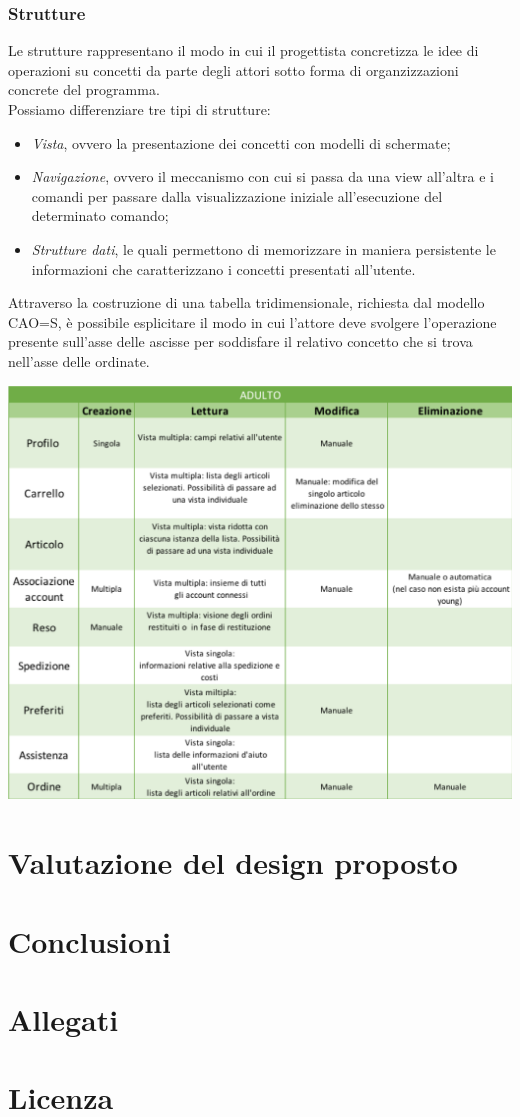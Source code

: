 \documentclass[12pt,a4paper]{report}
\begin{document}
\subsection{Strutture}
Le strutture rappresentano il modo in cui il progettista concretizza le idee di operazioni su concetti da parte degli attori sotto forma di organzizzazioni concrete del programma.\\
Possiamo differenziare tre tipi di strutture:
\begin{itemize}
\item \textit{Vista}, ovvero la presentazione dei concetti con modelli di schermate;
\item \textit{Navigazione}, ovvero il meccanismo con cui si passa da una view all'altra e i comandi per passare dalla visualizzazione iniziale all'esecuzione del determinato comando;
\item \textit{Strutture dati}, le quali permettono di memorizzare in maniera persistente le informazioni che caratterizzano i concetti presentati all'utente.
\end{itemize}
Attraverso la costruzione di una tabella tridimensionale, richiesta dal modello CAO=S, è possibile esplicitare il modo in cui l'attore deve svolgere l'operazione presente sull'asse delle ascisse per soddisfare il relativo concetto che si trova nell'asse delle ordinate.\\
\begin{center}
  \includegraphics[width=1\textwidth]{"Project Management Sources/StrutturaAdulto"}
\end{center}
\chapter{Valutazione del design proposto}
\chapter{Conclusioni}
\chapter{Allegati}
\chapter{Licenza}
\end{document}
